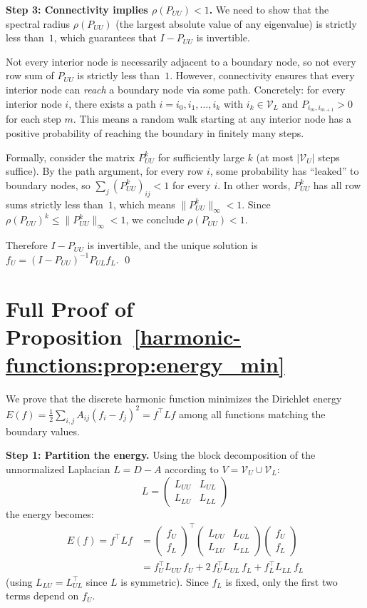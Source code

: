 \begin{notechapter}
\textbf{Step 3: Connectivity implies $\rho(P_{UU}) < 1$.} We need to show
that the spectral radius $\rho(P_{UU})$ (the largest absolute value of any
eigenvalue) is strictly less than~$1$, which guarantees that $I - P_{UU}$ is
invertible.

Not every interior node is necessarily adjacent to a boundary node, so not
every row sum of $P_{UU}$ is strictly less than~$1$. However, connectivity
ensures that every interior node can \emph{reach} a boundary node via some
path. Concretely: for every interior node $i$, there exists a path
$i = i_0, i_1, \ldots, i_k$ with $i_k \in \mathcal{V}_L$ and
$P_{i_m, i_{m+1}} > 0$ for each step $m$. This means a random walk starting
at any interior node has a positive probability of reaching the boundary in
finitely many steps.

Formally, consider the matrix $P_{UU}^k$ for sufficiently large $k$ (at most
$|\mathcal{V}_U|$ steps suffice). By the path argument, for every row $i$,
some probability has ``leaked'' to boundary nodes, so
$\sum_j (P_{UU}^k)_{ij} < 1$ for every $i$. In other words, $P_{UU}^k$ has
all row sums strictly less than~$1$, which means
$\|P_{UU}^k\|_\infty < 1$. Since $\rho(P_{UU})^k \leq \|P_{UU}^k\|_\infty
< 1$, we conclude $\rho(P_{UU}) < 1$.

Therefore $I - P_{UU}$ is invertible, and the unique solution is
$f_U = (I - P_{UU})^{-1}P_{UL}f_L$. \qed

\section{Full Proof of Proposition~\ref{harmonic-functions:prop:energy_min}}
\label{harmonic-functions:app:proof_energy}

We prove that the discrete harmonic function minimizes the Dirichlet energy
$E(f) = \frac{1}{2}\sum_{i,j}A_{ij}(f_i - f_j)^2 = f^\top Lf$ among all
functions matching the boundary values.

\textbf{Step 1: Partition the energy.} Using the block decomposition of the
unnormalized Laplacian $L = D - A$ according to
$V = \mathcal{V}_U \cup \mathcal{V}_L$:
\[
L = \begin{pmatrix} L_{UU} & L_{UL} \\ L_{LU} & L_{LL} \end{pmatrix}
\]
the energy becomes:
\begin{align}
E(f) = f^\top Lf
&= \begin{pmatrix} f_U \\ f_L \end{pmatrix}^\top
   \begin{pmatrix} L_{UU} & L_{UL} \\ L_{LU} & L_{LL} \end{pmatrix}
   \begin{pmatrix} f_U \\ f_L \end{pmatrix} \\
&= f_U^\top L_{UU}\,f_U + 2\,f_U^\top L_{UL}\,f_L
   + f_L^\top L_{LL}\,f_L
\end{align}
(using $L_{LU} = L_{UL}^\top$ since $L$ is symmetric). Since $f_L$ is
fixed, only the first two terms depend on $f_U$.


\end{notechapter}
